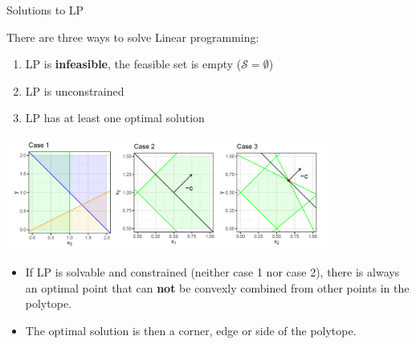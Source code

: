 \begin{vbframe}{Solutions to LP}

There are three ways to solve Linear programming:

\begin{enumerate}
\item LP is \textbf{infeasible}, the feasible set is empty ($\mathcal{S} = \emptyset$)
\item LP is unconstrained
\item LP has at least one optimal solution
\end{enumerate}


\begin{center}
\includegraphics[width = 0.8\textwidth]{figure_man/solutions-lp.png}
\end{center}


\framebreak

\begin{itemize}
\item If LP is solvable and constrained (neither case 1 nor case 2), there is always an optimal point that can  \textbf{not} be convexly combined from other points in the polytope.
\item The optimal solution is then a corner, edge or side of the polytope.
\end{itemize}


\end{vbframe}






